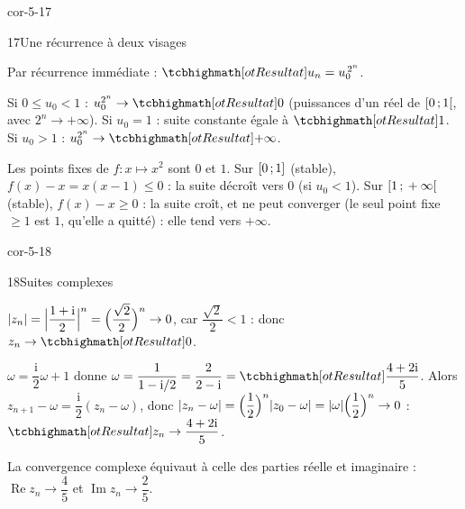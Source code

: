 \begin{blocLivre}{cor-5-17}
\begin{corrige}{17}{Une récurrence à deux visages}
\begin{questions}
  \item Par récurrence immédiate : $\res{u_n=u_0^{\,2^{n}}}$.
  \item Si $0\leq u_0<1$ : $u_0^{2^{n}}\to\res{0}$ (puissances d'un réel de
    $\mathopen{[}0\,{;}\,1\mathclose{[}$, avec $2^{n}\to+\infty$). Si $u_0=1$ : suite constante
    égale à $\res{1}$. Si $u_0>1$ : $u_0^{2^{n}}\to\res{+\infty}$.
  \item Les points fixes de $f:x\mapsto x^{2}$ sont $0$ et $1$. Sur
    $\mathopen{[}0\,{;}\,1\mathclose{]}$ (stable), $f(x)-x=x(x-1)\leq0$ : la suite décroît vers
    $0$ (si $u_0<1$). Sur $\mathopen{[}1\,{;}\,+\infty\mathclose{[}$ (stable), $f(x)-x\geq0$ : la
    suite croît, et ne peut converger (le seul point fixe $\geq1$ est $1$,
    qu'elle a quitté) : elle tend vers $+\infty$.
\end{questions}
\end{corrige}
\end{blocLivre}

\begin{blocLivre}{cor-5-18}
\begin{corrige}{18}{Suites complexes}
\begin{questions}
  \item $|z_n|=\Bigl|\dfrac{1+\mathrm{i}}{2}\Bigr|^{n}
    =\Bigl(\dfrac{\sqrt2}{2}\Bigr)^{n}\to0$, car
    $\dfrac{\sqrt2}{2}<1$ : donc $z_n\to\res{0}$.
  \item $\omega=\dfrac{\mathrm{i}}{2}\omega+1$ donne
    $\omega=\dfrac{1}{1-\mathrm{i}/2}=\dfrac{2}{2-\mathrm{i}}
    =\res{\dfrac{4+2\mathrm{i}}{5}}$. Alors
    $z_{n+1}-\omega=\dfrac{\mathrm{i}}{2}(z_n-\omega)$, donc
    $|z_n-\omega|=\Bigl(\dfrac12\Bigr)^{n}|z_0-\omega|
    =|\omega|\Bigl(\dfrac12\Bigr)^{n}\to0$ :
    $\res{z_n\to\dfrac{4+2\mathrm{i}}{5}}$.
  \item La convergence complexe équivaut à celle des parties réelle et
    imaginaire : $\operatorname{Re}z_n\to\dfrac45$ et
    $\operatorname{Im}z_n\to\dfrac25$.
\end{questions}
\end{corrige}
\end{blocLivre}

